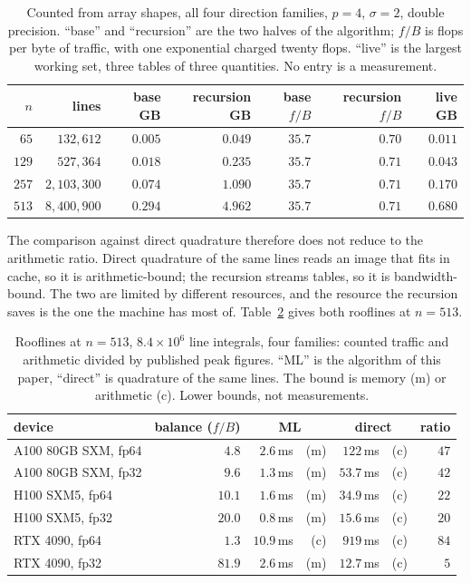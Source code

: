 \documentclass[11pt]{article}
\begin{document}
\begin{table}[t]
\centering\small
\caption{Counted from array shapes, all four direction families, $p=4$,
$\sigma=2$, double precision. ``base'' and ``recursion'' are the two halves of
the algorithm; $f/B$ is flops per byte of traffic, with one exponential
charged twenty flops. ``live'' is the largest working set, three tables of
three quantities. No entry is a measurement.}
\label{tab:gpucounts}
\begin{tabular}{rr rr rr r}
\toprule
$n$ & lines & base GB & recursion GB & base $f/B$ & recursion $f/B$ & live GB\\
\midrule
$65$  & $132{,}612$   & $0.005$ & $0.049$ & $35.7$ & $0.70$ & $0.011$\\
$129$ & $527{,}364$   & $0.018$ & $0.235$ & $35.7$ & $0.71$ & $0.043$\\
$257$ & $2{,}103{,}300$ & $0.074$ & $1.090$ & $35.7$ & $0.71$ & $0.170$\\
$513$ & $8{,}400{,}900$ & $0.294$ & $4.962$ & $35.7$ & $0.71$ & $0.680$\\
\bottomrule
\end{tabular}
\end{table}

The comparison against direct quadrature therefore does not reduce to the
arithmetic ratio. Direct quadrature of the same lines reads an image that fits
in cache, so it is arithmetic-bound; the recursion streams tables, so it is
bandwidth-bound. The two are limited by different resources, and the resource
the recursion saves is the one the machine has most of.
Table~\ref{tab:gpuroof} gives both rooflines at $n=513$.

\begin{table}[t]
\centering\small
\caption{Rooflines at $n=513$, $8.4\times10^{6}$ line integrals, four
families: counted traffic and arithmetic divided by published peak figures.
``ML'' is the algorithm of this paper, ``direct'' is quadrature of the same
lines. The bound is memory (m) or arithmetic (c). Lower bounds, not
measurements.}
\label{tab:gpuroof}
\begin{tabular}{l r rr rr r}
\toprule
device & balance ($f/B$) & \multicolumn{2}{c}{ML} &
\multicolumn{2}{c}{direct} & ratio\\
\midrule
A100 80GB SXM, fp64 & $4.8$  & $2.6$\,ms  & (m) & $122$\,ms & (c) & $47$\\
A100 80GB SXM, fp32 & $9.6$  & $1.3$\,ms  & (m) & $53.7$\,ms & (c) & $42$\\
H100 SXM5, fp64     & $10.1$ & $1.6$\,ms  & (m) & $34.9$\,ms & (c) & $22$\\
H100 SXM5, fp32     & $20.0$ & $0.8$\,ms  & (m) & $15.6$\,ms & (c) & $20$\\
RTX 4090, fp64      & $1.3$  & $10.9$\,ms & (c) & $919$\,ms & (c) & $84$\\
RTX 4090, fp32      & $81.9$ & $2.6$\,ms  & (m) & $12.7$\,ms & (c) & $5$\\
\bottomrule
\end{tabular}
\end{table}
\end{document}
